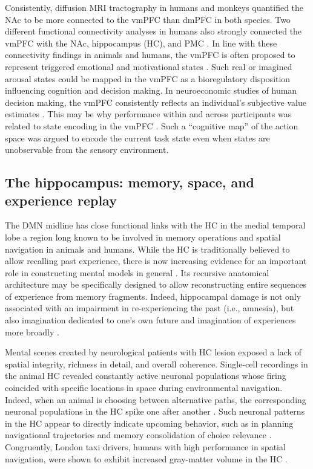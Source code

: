 \documentclass[10pt,letterpaper]{article}
\begin{document}
Consistently, diffusion MRI tractography in humans and monkeys
\citep{croxson2005quantitative}
quantified the NAc to
be more connected to the vmPFC than dmPFC in both species.
Two different functional connectivity analyses in humans also strongly connected
the vmPFC with the NAc, hippocampus (HC),
and PMC \citep{bzdok2015subspecialization}.
%
In line with these connectivity findings in animals and humans,
the vmPFC is often proposed to represent triggered
emotional and motivational states \citep{damasio1996somatic}.
Such real or imagined arousal states could be mapped in the vmPFC
as a bioregulatory disposition influencing cognition
and decision making.
In neuroeconomic studies of human decision making,
the vmPFC consistently reflects an individual’s subjective
value estimates
\citep{behrens2008associative}.
This may be why performance within and across participants
was related to state encoding in the vmPFC \citep{Schuck2016}.
Such a ``cognitive map'' of the action space was argued to encode
the current task state even when states are unobservable from
the sensory environment.

\subsection{The hippocampus: memory, space, and experience replay}
The DMN midline has close functional links
with the HC in the medial temporal lobe \citep{vincet2006, shannon2013morning} \textemdash
a region long known to be involved in
memory operations and spatial navigation in animals and humans.
While the HC
is traditionally believed to allow recalling past experience,
there is now increasing evidence for an important role
in constructing mental models in general
\citep{maguire2016, schacter2007remembering, gelbard2008internally, Javadi2017,
boyer2008evolutionary}.
Its recursive anatomical architecture
may be specifically designed to allow reconstructing
entire sequences of experience from memory fragments.
Indeed,
hippocampal damage is
not only associated with an impairment in re-experiencing the past (i.e., amnesia),
but also imagination dedicated to one's own future and
imagination of experiences more broadly \citep{hassabis2007patients}.

Mental scenes created by neurological patients with HC lesion exposed a lack of
spatial integrity, richness in detail, and overall coherence.
%
Single-cell recordings in the animal HC revealed
constantly active neuronal populations whose firing coincided with
specific locations in space during environmental navigation.
Indeed, when an animal is choosing between alternative
paths, the corresponding neuronal populations in the HC
spike one after another  \citep{johnson2007neural}.
Such neuronal patterns in the HC appear to directly indicate upcoming behavior,
such as in planning navigational trajectories
\citep{pfeiffer2013hippocampal} and
memory consolidation of choice relevance \citep{lavilleon2015}.
Congruently,
London taxi drivers, humans with high performance in spatial navigation,
were shown to exhibit increased gray-matter volume in the
HC \citep{maguire2000navigation}.
\end{document}
